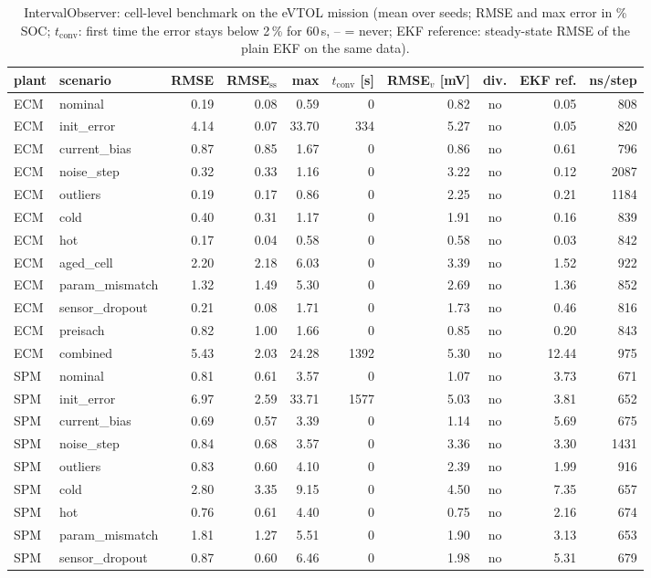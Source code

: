 \begin{table}[H]\centering\footnotesize\setlength{\tabcolsep}{4pt}
\caption{IntervalObserver: cell-level benchmark on the eVTOL mission (mean over seeds; RMSE and max error in \% SOC; $t_\mathrm{conv}$: first time the error stays below 2\,\% for 60\,s, -- = never; EKF reference: steady-state RMSE of the plain EKF on the same data).}\label{tab:cell_IntervalObserver}
\begin{tabular}{llrrrrrcrr}\toprule
plant & scenario & RMSE & RMSE$_\mathrm{ss}$ & max & $t_\mathrm{conv}$ [s] & RMSE$_v$ [mV] & div. & EKF ref. & ns/step \\ \midrule
ECM & nominal & 0.19 & 0.08 & 0.59 & 0 & 0.82 & no & 0.05 & 808 \\
ECM & init\_error & 4.14 & 0.07 & 33.70 & 334 & 5.27 & no & 0.05 & 820 \\
ECM & current\_bias & 0.87 & 0.85 & 1.67 & 0 & 0.86 & no & 0.61 & 796 \\
ECM & noise\_step & 0.32 & 0.33 & 1.16 & 0 & 3.22 & no & 0.12 & 2087 \\
ECM & outliers & 0.19 & 0.17 & 0.86 & 0 & 2.25 & no & 0.21 & 1184 \\
ECM & cold & 0.40 & 0.31 & 1.17 & 0 & 1.91 & no & 0.16 & 839 \\
ECM & hot & 0.17 & 0.04 & 0.58 & 0 & 0.58 & no & 0.03 & 842 \\
ECM & aged\_cell & 2.20 & 2.18 & 6.03 & 0 & 3.39 & no & 1.52 & 922 \\
ECM & param\_mismatch & 1.32 & 1.49 & 5.30 & 0 & 2.69 & no & 1.36 & 852 \\
ECM & sensor\_dropout & 0.21 & 0.08 & 1.71 & 0 & 1.73 & no & 0.46 & 816 \\
ECM & preisach & 0.82 & 1.00 & 1.66 & 0 & 0.85 & no & 0.20 & 843 \\
ECM & combined & 5.43 & 2.03 & 24.28 & 1392 & 5.30 & no & 12.44 & 975 \\
\midrule
SPM & nominal & 0.81 & 0.61 & 3.57 & 0 & 1.07 & no & 3.73 & 671 \\
SPM & init\_error & 6.97 & 2.59 & 33.71 & 1577 & 5.03 & no & 3.81 & 652 \\
SPM & current\_bias & 0.69 & 0.57 & 3.39 & 0 & 1.14 & no & 5.69 & 675 \\
SPM & noise\_step & 0.84 & 0.68 & 3.57 & 0 & 3.36 & no & 3.30 & 1431 \\
SPM & outliers & 0.83 & 0.60 & 4.10 & 0 & 2.39 & no & 1.99 & 916 \\
SPM & cold & 2.80 & 3.35 & 9.15 & 0 & 4.50 & no & 7.35 & 657 \\
SPM & hot & 0.76 & 0.61 & 4.40 & 0 & 0.75 & no & 2.16 & 674 \\
SPM & param\_mismatch & 1.81 & 1.27 & 5.51 & 0 & 1.90 & no & 3.13 & 653 \\
SPM & sensor\_dropout & 0.87 & 0.60 & 6.46 & 0 & 1.98 & no & 5.31 & 679 \\
\bottomrule\end{tabular}\end{table}
